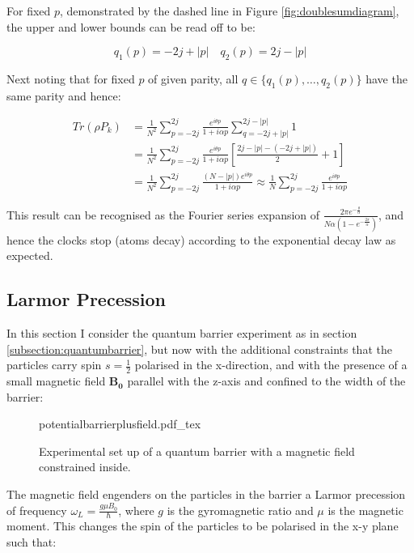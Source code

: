 \documentclass{article}
\newcommand{\incfig}[1]{%
    \def\svgwidth{10cm}
    {#1.pdf_tex}
}
\begin{document}
\noindent For fixed $p$, demonstrated by the dashed line in Figure \ref{fig:doublesumdiagram}, the upper and lower bounds can be read off to be:

\begin{equation}
	q_1(p)=-2j+|p| \quad q_2(p)=2j-|p|
\end{equation}

\noindent Next noting that for fixed $p$ of given parity, all $q \in \{q_1(p),\dots,q_2(p)\}$ have the same parity and hence:

\begin{align}
	Tr(\rho P_k) &= \frac{1}{N^2}\sum_{p=-2j}^{2j}\frac{e^{i\theta p}}{1+i\alpha p}\sum_{q=-2j+|p|}^{2j-|p|}1 \\
		     &= \frac{1}{N^2}\sum_{p=-2j}^{2j}\frac{e^{i\theta p}}{1+i\alpha p}\left[\frac{2j-|p|-(-2j+|p|)}{2}+1\right] \\
		     &= \frac{1}{N^2}\sum_{p=-2j}^{2j}\frac{(N-|p|)e^{i\theta p}}{1+i\alpha p} \approx \frac{1}{N}\sum_{p=-2j}^{2j}\frac{e^{i\theta p}}{1+i\alpha p}
\end{align}

\noindent This result can be recognised as the Fourier series expansion of $\frac{2\pi e^{-\frac{\theta}{\alpha}}}{N\alpha\left(1-e^{-\frac{2\pi}{\alpha}}\right)}$, and hence the clocks stop (atoms decay) according to the exponential decay law as expected.

\subsection{Larmor Precession}
\label{subsection:larmorprecession}
In this section I consider the quantum barrier experiment as in section \ref{subsection:quantumbarrier}, but now with the additional constraints that the particles carry spin $s=\frac{1}{2}$ polarised in the x-direction, and with the presence of a small magnetic field $\boldsymbol{B_0}$ parallel with the z-axis and confined to the width of the barrier:

\begin{figure}[ht]
    \centering
    \incfig{potentialbarrierplusfield}
    \caption{Experimental set up of a quantum barrier with a magnetic field constrained inside.}
    \label{fig:potentialbarrierfield}
\end{figure}

\noindent The magnetic field engenders on the particles in the barrier a Larmor precession of frequency $\omega_L = \frac{g\mu B_0}{\hbar}$, where $g$ is the gyromagnetic ratio and $\mu$ is the magnetic moment. This changes the spin of the particles to be polarised in the x-y plane such that:
\end{document}
